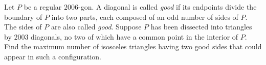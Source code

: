 Let $P$ be a regular $2006$-gon.
A diagonal is called \emph{good} if its endpoints
divide the boundary of $P$ into two parts,
each composed of an odd number of sides of $P$.
The sides of $P$ are also called \emph{good}.
Suppose $P$ has been dissected into triangles by $2003$ diagonals,
no two of which have a common point in the interior of $P$.
Find the maximum number of isosceles triangles having two good
sides that could appear in such a configuration.